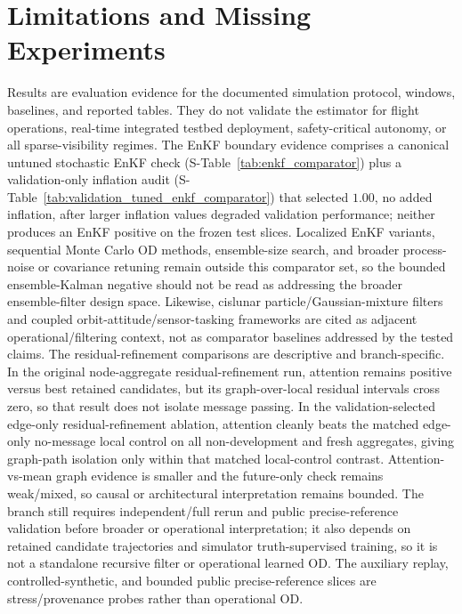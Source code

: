 \documentclass{article}
\begin{document}
\section{Limitations and Missing Experiments}
Results are evaluation evidence for the documented simulation protocol, windows, baselines, and reported tables. They do not validate the estimator for flight operations, real-time integrated testbed deployment, safety-critical autonomy, or all sparse-visibility regimes. The EnKF boundary evidence comprises a canonical untuned stochastic EnKF check (S-Table~\ref{tab:enkf_comparator}) plus a validation-only inflation audit (S-Table~\ref{tab:validation_tuned_enkf_comparator}) that selected \(1.00\), no added inflation, after larger inflation values degraded validation performance; neither produces an EnKF positive on the frozen test slices. Localized EnKF variants, sequential Monte Carlo OD methods, ensemble-size search, and broader process-noise or covariance retuning remain outside this comparator set, so the bounded ensemble-Kalman negative should not be read as addressing the broader ensemble-filter design space. Likewise, cislunar particle/Gaussian-mixture filters and coupled orbit-attitude/sensor-tasking frameworks are cited as adjacent operational/filtering context, not as comparator baselines addressed by the tested claims. The residual-refinement comparisons are descriptive and branch-specific. In the original node-aggregate residual-refinement run, attention remains positive versus best retained candidates, but its graph-over-local residual intervals cross zero, so that result does not isolate message passing. In the validation-selected edge-only residual-refinement ablation, attention cleanly beats the matched edge-only no-message local control on all non-development and fresh aggregates, giving graph-path isolation only within that matched local-control contrast. Attention-vs-mean graph evidence is smaller and the future-only check remains weak/mixed, so causal or architectural interpretation remains bounded. The branch still requires independent/full rerun and public precise-reference validation before broader or operational interpretation; it also depends on retained candidate trajectories and simulator truth-supervised training, so it is not a standalone recursive filter or operational learned OD. The auxiliary replay, controlled-synthetic, and bounded public precise-reference slices are stress/provenance probes rather than operational OD.
\end{document}
